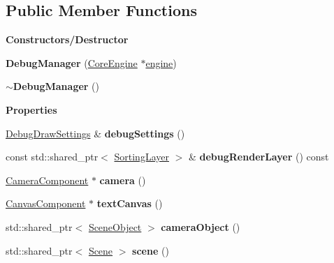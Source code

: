 \subsection*{Public Member Functions}
\begin{Indent}\textbf{ Constructors/\+Destructor}\par
\begin{DoxyCompactItemize}
\item 
\mbox{\label{classrev_1_1_debug_manager_a9fd04c1d74d1cc76077c07f142723009}} 
{\bfseries Debug\+Manager} (\mbox{\hyperlink{classrev_1_1_core_engine}{Core\+Engine}} $\ast$\mbox{\hyperlink{classrev_1_1_manager_a0fbd0df6b4f3caf42b557f9702f48171}{engine}})
\item 
\mbox{\label{classrev_1_1_debug_manager_a4a33b7cf142279ec82782c5e1896898f}} 
{\bfseries $\sim$\+Debug\+Manager} ()
\end{DoxyCompactItemize}
\end{Indent}
\begin{Indent}\textbf{ Properties}\par
\begin{DoxyCompactItemize}
\item 
\mbox{\label{classrev_1_1_debug_manager_a759c4f9e193f94a74523d155e5f8dc66}} 
\mbox{\hyperlink{classrev_1_1_debug_draw_settings}{Debug\+Draw\+Settings}} \& {\bfseries debug\+Settings} ()
\item 
\mbox{\label{classrev_1_1_debug_manager_a3794b24a7c39f086a0a1c84c1f1c05ed}} 
const std\+::shared\+\_\+ptr$<$ \mbox{\hyperlink{structrev_1_1_sorting_layer}{Sorting\+Layer}} $>$ \& {\bfseries debug\+Render\+Layer} () const
\item 
\mbox{\label{classrev_1_1_debug_manager_a56e7b395a714219b8e57086871e99452}} 
\mbox{\hyperlink{classrev_1_1_camera_component}{Camera\+Component}} $\ast$ {\bfseries camera} ()
\item 
\mbox{\label{classrev_1_1_debug_manager_a232ea27e16819306a83e3da9ad6646d1}} 
\mbox{\hyperlink{classrev_1_1_canvas_component}{Canvas\+Component}} $\ast$ {\bfseries text\+Canvas} ()
\item 
\mbox{\label{classrev_1_1_debug_manager_a4af83f2d3f6f2f320ad6f1030916213a}} 
std\+::shared\+\_\+ptr$<$ \mbox{\hyperlink{classrev_1_1_scene_object}{Scene\+Object}} $>$ {\bfseries camera\+Object} ()
\item 
\mbox{\label{classrev_1_1_debug_manager_a9c6708f36f5fb4a2fa233feb72fdb3aa}} 
std\+::shared\+\_\+ptr$<$ \mbox{\hyperlink{classrev_1_1_scene}{Scene}} $>$ {\bfseries scene} ()
\end{DoxyCompactItemize}
\end{Indent}
